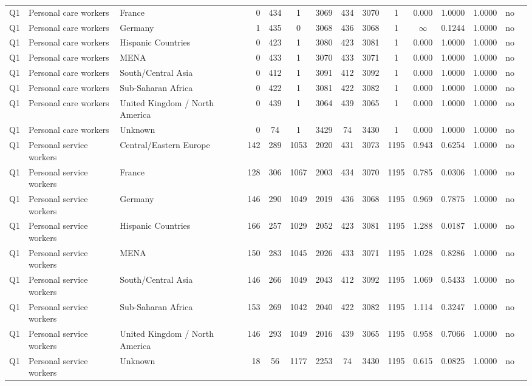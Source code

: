 \begin{longtable}{lllrcccccccccll}
Q1 & Personal care workers & France & 0 & 434 & 1 & 3069 & 434 & 3070 & 1 & 0.000 & 1.0000 & 1.0000 & no \\
Q1 & Personal care workers & Germany & 1 & 435 & 0 & 3068 & 436 & 3068 & 1 & $\infty$ & 0.1244 & 1.0000 & no \\
Q1 & Personal care workers & Hispanic Countries & 0 & 423 & 1 & 3080 & 423 & 3081 & 1 & 0.000 & 1.0000 & 1.0000 & no \\
Q1 & Personal care workers & MENA & 0 & 433 & 1 & 3070 & 433 & 3071 & 1 & 0.000 & 1.0000 & 1.0000 & no \\
Q1 & Personal care workers & South/Central Asia & 0 & 412 & 1 & 3091 & 412 & 3092 & 1 & 0.000 & 1.0000 & 1.0000 & no \\
Q1 & Personal care workers & Sub-Saharan Africa & 0 & 422 & 1 & 3081 & 422 & 3082 & 1 & 0.000 & 1.0000 & 1.0000 & no \\
Q1 & Personal care workers & United Kingdom / North America & 0 & 439 & 1 & 3064 & 439 & 3065 & 1 & 0.000 & 1.0000 & 1.0000 & no \\
Q1 & Personal care workers & Unknown & 0 & 74 & 1 & 3429 & 74 & 3430 & 1 & 0.000 & 1.0000 & 1.0000 & no \\
Q1 & Personal service workers & Central/Eastern Europe & 142 & 289 & 1053 & 2020 & 431 & 3073 & 1195 & 0.943 & 0.6254 & 1.0000 & no \\
Q1 & Personal service workers & France & 128 & 306 & 1067 & 2003 & 434 & 3070 & 1195 & 0.785 & 0.0306 & 1.0000 & no \\
Q1 & Personal service workers & Germany & 146 & 290 & 1049 & 2019 & 436 & 3068 & 1195 & 0.969 & 0.7875 & 1.0000 & no \\
Q1 & Personal service workers & Hispanic Countries & 166 & 257 & 1029 & 2052 & 423 & 3081 & 1195 & 1.288 & 0.0187 & 1.0000 & no \\
Q1 & Personal service workers & MENA & 150 & 283 & 1045 & 2026 & 433 & 3071 & 1195 & 1.028 & 0.8286 & 1.0000 & no \\
Q1 & Personal service workers & South/Central Asia & 146 & 266 & 1049 & 2043 & 412 & 3092 & 1195 & 1.069 & 0.5433 & 1.0000 & no \\
Q1 & Personal service workers & Sub-Saharan Africa & 153 & 269 & 1042 & 2040 & 422 & 3082 & 1195 & 1.114 & 0.3247 & 1.0000 & no \\
Q1 & Personal service workers & United Kingdom / North America & 146 & 293 & 1049 & 2016 & 439 & 3065 & 1195 & 0.958 & 0.7066 & 1.0000 & no \\
Q1 & Personal service workers & Unknown & 18 & 56 & 1177 & 2253 & 74 & 3430 & 1195 & 0.615 & 0.0825 & 1.0000 & no \\

\end{longtable}
